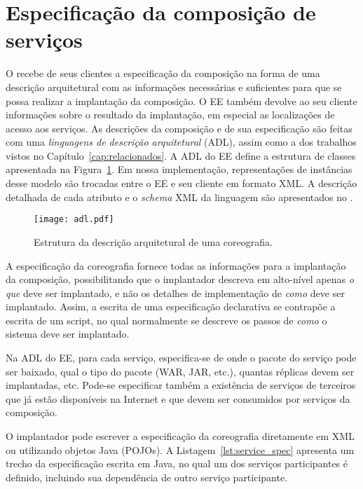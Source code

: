 \section{Especificação da composição de serviços}
\label{sec:spec}

O \ee recebe de seus clientes a especificação da composição na forma 
de uma descrição arquitetural com as informações necessárias e suficientes para 
que se possa realizar a implantação da composição. 
O EE também devolve ao seu cliente informações sobre o resultado da implantação, 
em especial as localizações de acesso aos serviços. As descrições da composição e de sua 
especificação são feitas com uma \emph{linguagens de descrição arquitetural} (ADL), 
assim como a dos trabalhos vistos no Capítulo~\ref{cap:relacionados}. 
A ADL do EE define a estrutura de classes apresentada na Figura~\ref{fig:adl}. 
Em nossa implementação, representações de instâncias desse modelo 
são trocadas entre o EE e seu cliente em formato XML. 
A descrição detalhada de cada atributo e o \emph{schema} XML da linguagem
são apresentados no \userguide.

\begin{figure}[!h]
  \centering
  \texttt{[image: adl.pdf]} 
  \caption{Estrutura da descrição arquitetural de uma coreografia.}
  \label{fig:adl} 
\end{figure}

A especificação da coreografia fornece todas as informações para a implantação da composição,
possibilitando que o implantador descreva em alto-nível apenas \emph{o que} deve ser implantado,
e não os detalhes de implementação de \emph{como} deve ser implantado.
Assim, a escrita de uma especificação declarativa se contrapõe a escrita de um script,
no qual normalmente se descreve os passos de \emph{como} o sistema deve ser implantado.

Na ADL do EE, para cada serviço, especifica-se de onde o pacote do serviço pode ser baixado, 
qual o tipo do pacote (WAR, JAR, etc.), quantas réplicas devem ser implantadas, etc.
Pode-se especificar também a existência de serviços
de terceiros que já estão disponíveis na Internet e que devem
ser consumidos por serviços da composição.

O implantador pode escrever a especificação da coreografia diretamente em XML
ou utilizando objetos Java (POJOs).
A Listagem~\ref{lst:service_spec} apresenta um trecho da especificação escrita em Java,
no qual um dos serviços participantes é definido,
incluindo sua dependência de outro serviço participante.

